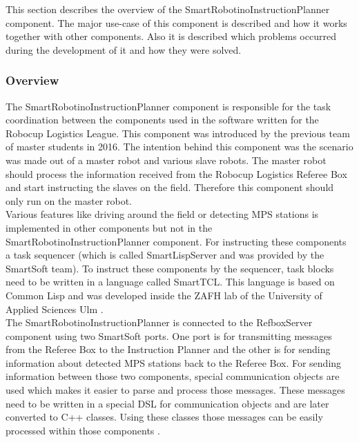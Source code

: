 This section describes the overview of the SmartRobotinoInstructionPlanner component. The major use-case of this component is described and how it works together with other components. Also it is described which problems occurred during the development of it and how they were solved. 


\subsubsection{Overview}
\label{sec:inst_overview}

The SmartRobotinoInstructionPlanner component is responsible for the task coordination between the components used in the software written for the 
Robocup Logistics League. This component was introduced by the previous team of master students in 2016. The intention behind this component was the scenario was made out of a master robot and various slave robots. The master robot should process the information received from the Robocup Logistics Referee Box and start instructing the slaves on the field. Therefore this component should only run on the master robot. \\

Various features like driving around the field or detecting MPS stations is implemented in other components but not in the SmartRobotinoInstructionPlanner component. For instructing these components a task sequencer (which is called SmartLispServer and was provided by the SmartSoft team). To instruct these components by the sequencer, task blocks need to be written in a language called SmartTCL. This language is based on Common Lisp and was developed inside the ZAFH lab of the University of Applied Sciences Ulm \cite{SS10}.  \\ 

The SmartRobotinoInstructionPlanner is connected to the RefboxServer component using two SmartSoft ports. One port is for transmitting messages from the Referee Box to the Instruction Planner and the other is for sending information about detected MPS stations back to the Referee Box. For sending information between those two components, special communication objects are used which makes it easier to parse and process those messages. These messages need to be written in a special DSL for communication objects and are later converted to C++ classes. Using these classes those messages can be easily processed within those components \cite{CO}. \\


